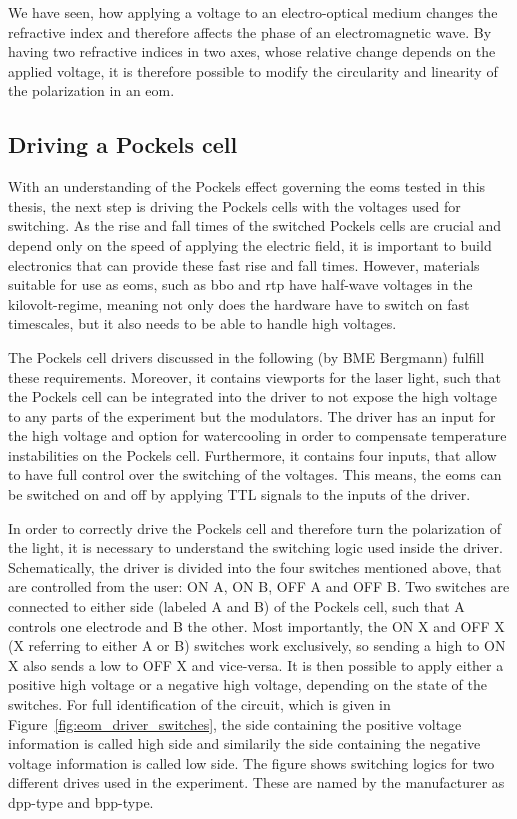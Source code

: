 We have seen, how applying a voltage to an electro-optical medium changes the refractive index and therefore affects the phase of an electromagnetic wave. By having two refractive indices in two axes, whose relative change depends on the applied voltage, it is therefore possible to modify the circularity and linearity of the polarization in an \acl{eom}.

\subsection{Driving a Pockels cell}%
\label{sec:pockels_cell_drive}

With an understanding of the Pockels effect governing the \acp{eom} tested in this thesis, the next step is driving the Pockels cells with the voltages used for switching. As the rise and fall times of the switched Pockels cells are crucial and depend only on the speed of applying the electric field, it is important to build electronics that can provide these fast rise and fall times. However, materials suitable for use as \acp{eom}, such as \ac{bbo} and \ac{rtp} have half-wave voltages in the kilovolt-regime, meaning not only does the hardware have to switch on fast timescales, but it also needs to be able to handle high voltages.

The Pockels cell drivers discussed in the following (by BME Bergmann) fulfill these requirements. Moreover, it contains viewports for the laser light, such that the Pockels cell can be integrated into the driver to not expose the high voltage to any parts of the experiment but the modulators. The driver has an input for the high voltage and option for watercooling in order to compensate temperature instabilities on the Pockels cell. Furthermore, it contains four inputs, that allow to have full control over the switching of the voltages. This means, the \acp{eom} can be switched on and off by applying TTL signals to the inputs of the driver.

In order to correctly drive the Pockels cell and therefore turn the polarization of the light, it is necessary to understand the switching logic used inside the driver. Schematically, the driver is divided into the four switches mentioned above, that are controlled from the user: ON A, ON B, OFF A and OFF B. Two switches are connected to either side (labeled A and B) of the Pockels cell, such that A controls one electrode and B the other. Most importantly, the ON X and OFF X (X referring to either A or B) switches work exclusively, so sending a high to ON X also sends a low to OFF X and vice-versa. It is then possible to apply either a positive high voltage or a negative high voltage, depending on the state of the switches. For full identification of the circuit, which is given in Figure~\ref{fig:eom_driver_switches}, the side containing the positive voltage information is called high side and similarily the side containing the negative voltage information is called low side. The figure shows switching logics for two different drives used in the experiment. These are named by the manufacturer as dpp-type and bpp-type.


